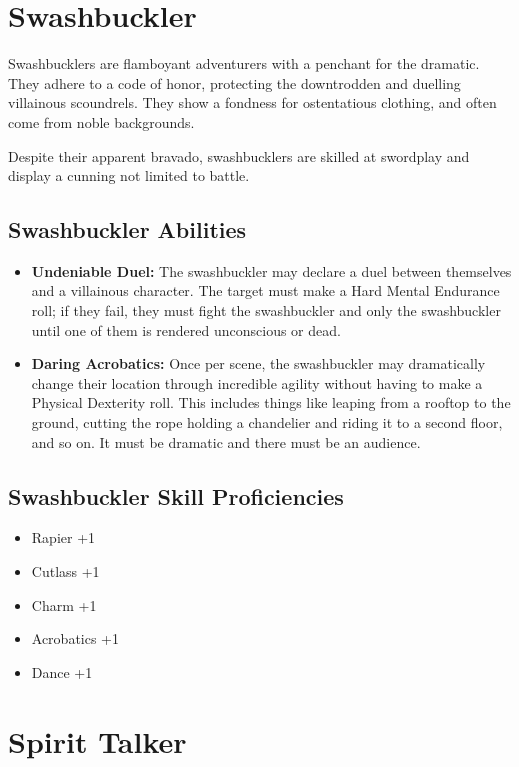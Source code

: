 \begin{multicols}{2}
\section{Swashbuckler}

Swashbucklers are flamboyant adventurers with a penchant for the dramatic.
They adhere to a code of honor, protecting the downtrodden and duelling
villainous scoundrels. They show a fondness for ostentatious clothing, and
often come from noble backgrounds.

Despite their apparent bravado, swashbucklers are skilled at swordplay and
display a cunning not limited to battle.

\subsection{Swashbuckler Abilities}

\begin{itemize}
    \item \textbf{Undeniable Duel:} The swashbuckler may declare a duel between
    themselves and a villainous character. The target must make a Hard Mental
    Endurance roll; if they fail, they must fight the swashbuckler and only the
    swashbuckler until one of them is rendered unconscious or dead.
    \item \textbf{Daring Acrobatics:} Once per scene, the swashbuckler may
    dramatically change their location through incredible agility without having
    to make a Physical Dexterity roll. This includes things like leaping from a
    rooftop to the ground, cutting the rope holding a chandelier and riding it to
    a second floor, and so on. It must be dramatic and there must be an audience.
\end{itemize}

\subsection{Swashbuckler Skill Proficiencies}

\begin{itemize}
    \item Rapier +1
    \item Cutlass +1
    \item Charm +1
    \item Acrobatics +1
    \item Dance +1
\end{itemize}

\section{Spirit Talker}


\end{multicols}
